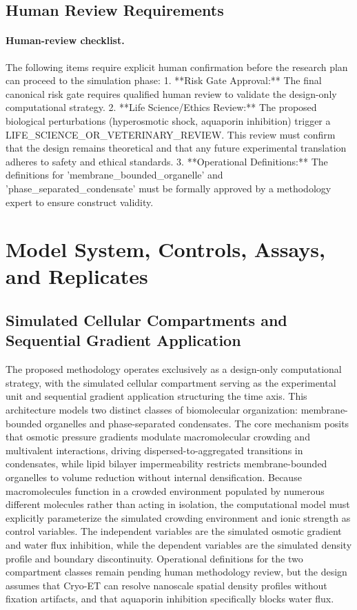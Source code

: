 \documentclass[conference]{IEEEtran}
\begin{document}
\subsection{Human Review Requirements}
\paragraph{Human-review checklist.} The following items require explicit human confirmation before the research plan can proceed to the simulation phase: 1. **Risk Gate Approval:** The final canonical risk gate requires qualified human review to validate the design-only computational strategy. 2. **Life Science/Ethics Review:** The proposed biological perturbations (hyperosmotic shock, aquaporin inhibition) trigger a LIFE\_SCIENCE\_OR\_VETERINARY\_REVIEW. This review must confirm that the design remains theoretical and that any future experimental translation adheres to safety and ethical standards. 3. **Operational Definitions:** The definitions for 'membrane\_bounded\_organelle' and 'phase\_separated\_condensate' must be formally approved by a methodology expert to ensure construct validity.

\section{Model System, Controls, Assays, and Replicates}
\subsection{Simulated Cellular Compartments and Sequential Gradient Application}
The proposed methodology operates exclusively as a design-only computational strategy, with the simulated cellular compartment serving as the experimental unit and sequential gradient application structuring the time axis. This architecture models two distinct classes of biomolecular organization: membrane-bounded organelles and phase-separated condensates. The core mechanism posits that osmotic pressure gradients modulate macromolecular crowding and multivalent interactions, driving dispersed-to-aggregated transitions in condensates, while lipid bilayer impermeability restricts membrane-bounded organelles to volume reduction without internal densification. Because macromolecules function in a crowded environment populated by numerous different molecules rather than acting in isolation, the computational model must explicitly parameterize the simulated crowding environment and ionic strength as control variables. The independent variables are the simulated osmotic gradient and water flux inhibition, while the dependent variables are the simulated density profile and boundary discontinuity. Operational definitions for the two compartment classes remain pending human methodology review, but the design assumes that Cryo-ET can resolve nanoscale spatial density profiles without fixation artifacts, and that aquaporin inhibition specifically blocks water flux.~\cite{cite_42ed299a53990c06,cite_8d46403814b99258}
\end{document}
